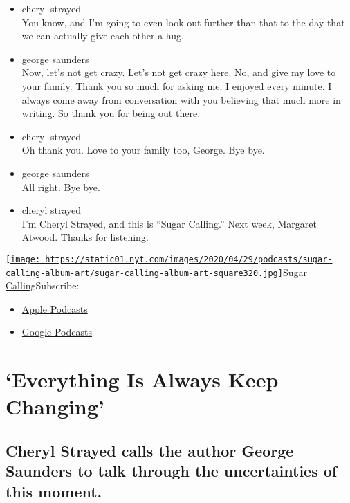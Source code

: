 \begin{itemize}
\item
  cheryl strayed\\
  You know, and I'm going to even look out further than that to the day
  that we can actually give each other a hug.
\item
  george saunders\\
  Now, let's not get crazy. Let's not get crazy here. No, and give my
  love to your family. Thank you so much for asking me. I enjoyed every
  minute. I always come away from conversation with you believing that
  much more in writing. So thank you for being out there.
\item
  cheryl strayed\\
  Oh thank you. Love to your family too, George. Bye bye.
\item
  george saunders\\
  All right. Bye bye.
\item
  cheryl strayed\\
  I'm Cheryl Strayed, and this is ``Sugar Calling.'' Next week, Margaret
  Atwood. Thanks for listening.
\end{itemize}

\href{https://www.nytimes.com/column/sugar-calling}{\texttt{[image: https://static01.nyt.com/images/2020/04/29/podcasts/sugar-calling-album-art/sugar-calling-album-art-square320.jpg]}Sugar
Calling}Subscribe:

\begin{itemize}
\tightlist
\item
  \href{https://itunes.apple.com/us/podcast/id1505881384}{Apple
  Podcasts}
\item
  \href{https://podcasts.google.com/?feed=aHR0cHM6Ly9yc3MuYXJ0MTkuY29tL3N1Z2FyLWNhbGxpbmc\&ved=0CAUQrrcFahcKEwjA8Kyn09voAhUAAAAAHQAAAAAQBQ}{Google
  Podcasts}
\end{itemize}

\hypertarget{everything-is-always-keep-changing-1}{%
\section{`Everything Is Always Keep
Changing'}\label{everything-is-always-keep-changing-1}}

\hypertarget{cheryl-strayed-calls-the-author-george-saunders-to-talk-through-the-uncertainties-of-this-moment-1}{%
\subsection{Cheryl Strayed calls the author George Saunders to talk
through the uncertainties of this
moment.}\label{cheryl-strayed-calls-the-author-george-saunders-to-talk-through-the-uncertainties-of-this-moment-1}}

